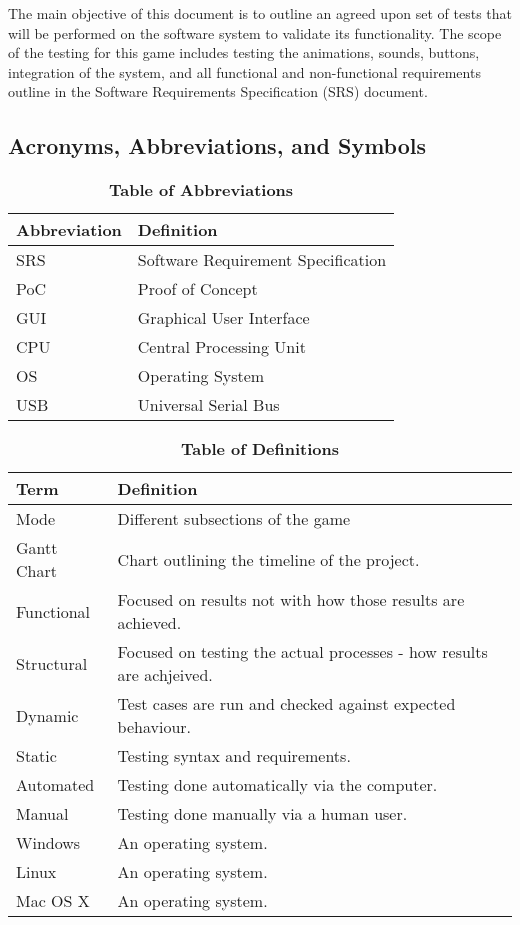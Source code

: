 \documentclass[12pt, titlepage]{article}
\begin{document}
\par The main objective of this document is to outline an agreed upon set of tests that will be performed on the software system to validate its functionality. The scope of the testing for this game includes testing the animations, sounds, buttons, integration of the system, and all functional and non-functional requirements outline in the Software Requirements Specification (SRS) document.


\subsection{Acronyms, Abbreviations, and Symbols}
	
\begin{table}[hbp]
\caption{\textbf{Table of Abbreviations}} \label{Table}
\begin{tabularx}{\textwidth}{p{3cm}X}
\toprule
\textbf{Abbreviation} & \textbf{Definition} \\
\midrule
SRS & Software Requirement Specification\\
PoC & Proof of Concept\\
GUI & Graphical User Interface\\
CPU & Central Processing Unit\\
OS & Operating System\\
USB & Universal Serial Bus\\

\bottomrule
\end{tabularx}
\end{table}


\begin{table}[!htbp]
\caption{\textbf{Table of Definitions}} \label{Table}
\begin{tabularx}{\textwidth}{p{3cm}X}
\toprule
\textbf{Term} & \textbf{Definition}\\
\midrule
Mode & Different subsections of the game\\
Gantt Chart & Chart outlining the timeline of the project.\\
Functional  & Focused on results not with how those results are achieved. \\
Structural & Focused on testing the actual processes - how results are achjeived.\\
Dynamic  & Test cases are run and checked against expected behaviour. \\
Static & Testing syntax and requirements.\\
Automated  & Testing done automatically via the computer.\\ 
Manual  & Testing done manually via a human user. \\
Windows & An operating system.\\
Linux & An operating system.\\
Mac OS X & An operating system.\\

\bottomrule
\end{tabularx}
\end{table}	
\end{document}
